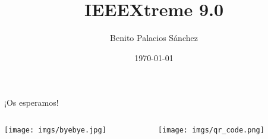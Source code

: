 \documentclass[usenames,dvipsnames]{beamer}
\title{IEEEXtreme 9.0}
\date[Septiembre de 2015]{\today}
\author{Benito Palacios Sánchez}
\institute[IEEE SB UGR]{Rama estudiantil de IEEE en la UGR}
\begin{document}
	\begin{frame}[plain]
    		\titlepage
	\end{frame}

	
	
	
	
	\section{}
	\begin{frame}
		\begin{center}
			\huge ¡Os esperamos!
		\end{center}
		
		\begin{columns}\begin{column}{0.60\textwidth}
			\texttt{[image: imgs/byebye.jpg]}
		\end{column}\begin{column}{0.40\textwidth}
			\texttt{[image: imgs/qr\_code.png]}
		\end{column}\end{columns}
	\end{frame}
\end{document}
